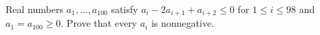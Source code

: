 Real numbers $a_1,\ldots,a_{100}$ satisfy $a_i-2a_{i+1}+a_{i+2}\le0$ for $1\le i\le98$ and $a_1=a_{100}\ge0$. Prove that every $a_i$ is nonnegative.
